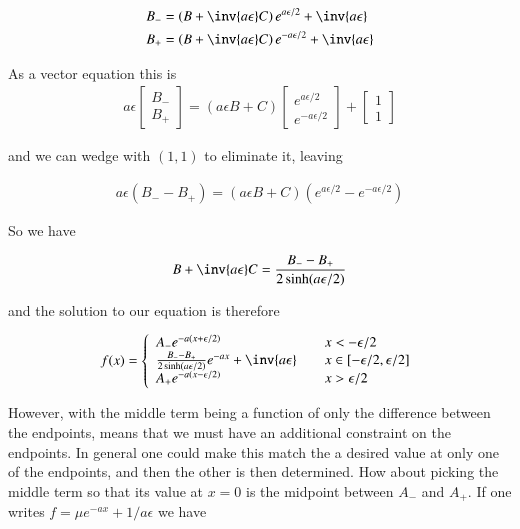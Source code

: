 \begin{align*}
B_{-} &= \left(B + \inv{a \epsilon } C \right) e^{a \epsilon/2} + \inv{a \epsilon} \\
B_{+} &= \left(B + \inv{a \epsilon } C \right) e^{-a \epsilon/2} + \inv{a \epsilon} \\
\end{align*}

As a vector equation this is
\begin{align*}
a \epsilon
\begin{bmatrix}
B_{-} \\
B_{+} 
\end{bmatrix}
=
\left(a \epsilon B + C \right) 
\begin{bmatrix}
e^{a \epsilon/2} \\
e^{-a \epsilon/2} 
\end{bmatrix}
+
\begin{bmatrix}
1 \\
1
\end{bmatrix}
\end{align*}

and we can wedge with $(1,1)$ to eliminate it, leaving

\begin{align*}
a \epsilon
(B_{-} - B_{+})
=
\left(a \epsilon B + C \right) 
(e^{a \epsilon/2} - e^{-a \epsilon/2})
\end{align*}

So we have

\begin{align*}
B + \inv{a \epsilon}C = \frac{B_{-} - B_{+}}{2 \sinh(a \epsilon/2)}
\end{align*}

and the solution to our equation is therefore

\begin{align*}
f(x) = 
\left\{
\begin{array}{l l}
A_{-} e^{-a(x + \epsilon/2)} & \quad x < -\epsilon/2 \\
\frac{B_{-} - B_{+}}{2 \sinh(a \epsilon/2)} e^{-ax} + \inv{a \epsilon} & \quad x \in \left[-\epsilon/2, \epsilon/2 \right] \\
A_{+} e^{-a(x - \epsilon/2)} & \quad x > \epsilon/2 \\
\end{array} \right.
\end{align*}

However, with the middle term being a function of only the difference between the endpoints, means that we must have an additional constraint on the endpoints.  In general one could make this match the a desired value at only one of the endpoints, and then the other is then determined.  How about picking the middle term so that its 
value at $x=0$ is the midpoint between $A_{-}$ and $A_{+}$.  If one writes $f = \mu e^{-ax} + 1/a \epsilon$ we have

